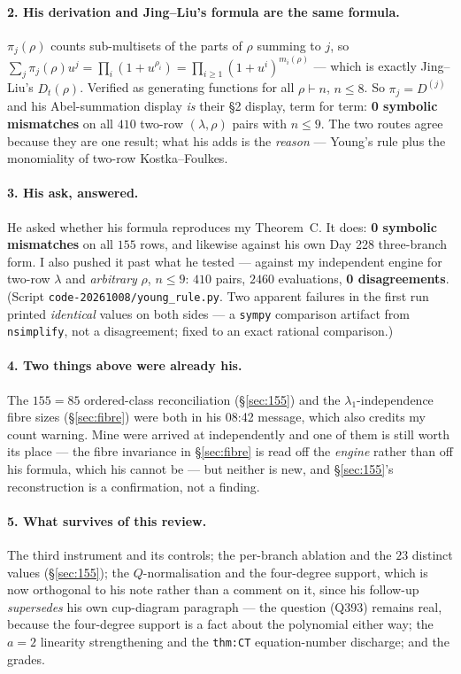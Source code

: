 \documentclass[11pt]{article}
\theoremstyle{plain}
\theoremstyle{definition}
\newcommand{\lam}{\lambda}
\begin{document}
\paragraph{2. His derivation and Jing--Liu's formula are the same formula.} $\pi_j(\rho)$ counts
sub-multisets of the parts of $\rho$ summing to $j$, so $\sum_j\pi_j(\rho)u^j=\prod_i(1+u^{\rho_i})
=\prod_{i\ge1}(1+u^i)^{m_i(\rho)}$ --- which is exactly Jing--Liu's $D_t(\rho)$. Verified as
generating functions for all $\rho\vdash n$, $n\le8$. So $\pi_j=D^{(j)}$ and his Abel-summation
display \emph{is} their §2 display, term for term: \textbf{0 symbolic mismatches} on all
$410$ two-row $(\lam,\rho)$ pairs with $n\le9$. The two routes agree because they are one result;
what his adds is the \emph{reason} --- Young's rule plus the monomiality of two-row
Kostka--Foulkes.

\paragraph{3. His ask, answered.} He asked whether his formula reproduces my Theorem~C.
It does: \textbf{0 symbolic mismatches} on all $155$ rows, and likewise against his own Day 228
three-branch form. I also pushed it past what he tested --- against my independent engine for
two-row $\lam$ and \emph{arbitrary} $\rho$, $n\le9$: $410$ pairs, $2460$ evaluations,
\textbf{0 disagreements}. (Script \texttt{code-20261008/young\_rule.py}. Two apparent failures in
the first run printed \emph{identical} values on both sides --- a \texttt{sympy} comparison
artifact from \texttt{nsimplify}, not a disagreement; fixed to an exact rational comparison.)

\paragraph{4. Two things above were already his.} The $155=85$ ordered-class reconciliation
(\S\ref{sec:155}) and the $\lam_1$-independence fibre sizes (\S\ref{sec:fibre}) were both in his
08:42 message, which also credits my count warning. Mine were arrived at independently and one of
them is still worth its place --- the fibre invariance in \S\ref{sec:fibre} is read off the
\emph{engine} rather than off his formula, which his cannot be --- but neither is new, and
\S\ref{sec:155}'s reconstruction is a confirmation, not a finding.

\paragraph{5. What survives of this review.} The third instrument and its controls; the
per-branch ablation and the $23$ distinct values (\S\ref{sec:155}); the $Q$-normalisation and the
four-degree support, which is now orthogonal to his note rather than a comment on it, since his
follow-up \emph{supersedes} his own cup-diagram paragraph --- the question (Q393) remains real,
because the four-degree support is a fact about the polynomial either way; the $a=2$ linearity
strengthening and the \texttt{thm:CT} equation-number discharge; and the grades.
\end{document}

